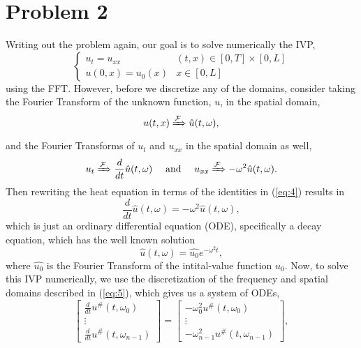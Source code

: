 \documentclass[11pt]{article}
\begin{document}
\section{Problem 2}
Writing out the problem again, our goal is to solve numerically the IVP,
			\[
		\begin{cases}
			u_t = u_{xx} & (t,x) \in [0,T] \times [0,L] \\
			u(0,x) = u_0(x) & x \in [0,L]
		\end{cases}
			\]
using the FFT. However, before we discretize any of the domains,
consider taking the Fourier Transform of the unknown function, $u$, in the spatial domain,
\begin{equation*}
	u(t,x) \xRightarrow[]{\mathcal{F}} \hat{u}(t,\omega),
\end{equation*}
and the Fourier Transforms of $u_t$ and $u_{xx}$ in the spatial domain as well,
\begin{equation}
	u_t \xRightarrow[]{\mathcal{F}} \frac{d}{dt}\hat{u}(t,\omega) \quad \text{ and } \quad u_{xx} \xRightarrow[]{\mathcal{F}} -\omega^2\hat{u}(t,\omega).
	\label{eq:4}
\end{equation}
Then rewriting the heat equation in terms of the identities in (\ref{eq:4}) results in
\begin{equation*}
	\frac{d}{dt}\hat{u}(t,\omega) = -\omega^2\hat{u}(t,\omega),
\end{equation*}
which is just an ordinary differential equation (ODE), specifically a decay equation,
which has the well known solution
\begin{equation*}
	\hat{u}(t,\omega) = \hat{u_0}e^{-\omega^2t},
\end{equation*}
where $\hat{u_0}$ is the Fourier Transform of the intital-value function $u_0$.
Now, to solve this IVP numerically, we use the discretization of the frequency and spatial domains
described in (\ref{eq:5}), which gives us a system of ODEs,
	\begin{equation*}
		\begin{bmatrix}
			\frac{d}{dt}u^{\#}(t,\omega_0) \\
			\vdots \\
			\frac{d}{dt}u^{\#}(t,\omega_{n-1})
		\end{bmatrix}
		=
		\begin{bmatrix}
			-\omega_0^2u^{\#}(t,\omega_0) \\
			\vdots \\
			-\omega_{n-1}^2u^{\#}(t,\omega_{n-1})
		\end{bmatrix},
	\end{equation*}
\end{document}
